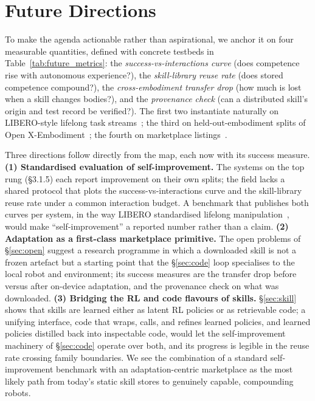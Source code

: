 \section{Future Directions}
\label{sec:future}

To make the agenda actionable rather than aspirational, we anchor it on four measurable
quantities, defined with concrete testbeds in Table~\ref{tab:future_metrics}: the
\emph{success-vs-interactions curve} (does competence rise with autonomous experience?), the
\emph{skill-library reuse rate} (does stored competence compound?), the \emph{cross-embodiment
transfer drop} (how much is lost when a skill changes bodies?), and the \emph{provenance check}
(can a distributed skill's origin and test record be verified?). The first two instantiate
naturally on LIBERO-style lifelong task streams~\citep{libero}; the third on held-out-embodiment
splits of Open X-Embodiment~\citep{openx}; the fourth on marketplace
listings~\citep{unistore2026}.



Three directions follow directly from the map, each now with its success measure.
\textbf{(1) Standardised evaluation of self-improvement.} The systems on the top rung
(\S3.1.5) each report improvement on their own splits; the field lacks a shared protocol that
plots the success-vs-interactions curve and the skill-library reuse rate under a common interaction
budget. A benchmark that publishes both curves per system, in the way LIBERO standardised
lifelong manipulation~\citep{libero}, would make ``self-improvement'' a reported number rather
than a claim. \textbf{(2) Adaptation as a first-class marketplace primitive.} The open problems
of \S\ref{sec:open} suggest a research programme in which a downloaded skill is not a frozen
artefact but a starting point that the \S\ref{sec:code} loop specialises to the local robot and
environment; its success measures are the transfer drop before versus after on-device
adaptation, and the provenance check on what was downloaded. \textbf{(3) Bridging the RL and
code flavours of skills.} \S\ref{sec:skill} shows that skills are learned either as latent RL
policies or as retrievable code; a unifying interface, code that wraps, calls, and refines
learned policies, and learned policies distilled back into inspectable code, would let the
self-improvement machinery of \S\ref{sec:code} operate over both, and its progress is legible in
the reuse rate crossing family boundaries. We see the combination of a standard self-improvement
benchmark with an adaptation-centric marketplace as the most likely path from today's static
skill stores to genuinely capable, compounding robots.
